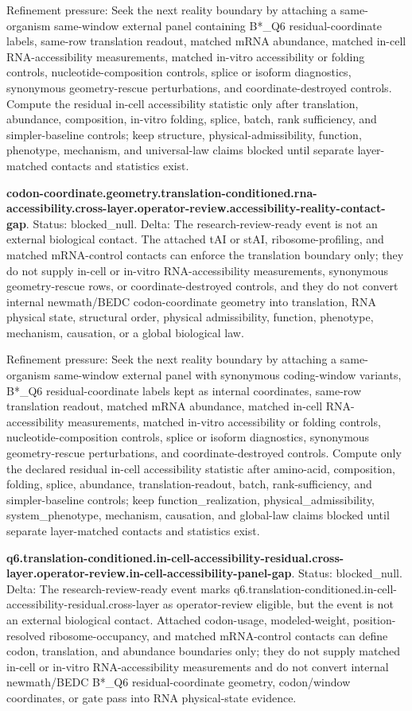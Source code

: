 Refinement pressure: Seek the next reality boundary by attaching a same-organism same-window external panel containing B*\_Q6 residual-coordinate labels, same-row translation readout, matched mRNA abundance, matched in-cell RNA-accessibility measurements, matched in-vitro accessibility or folding controls, nucleotide-composition controls, splice or isoform diagnostics, synonymous geometry-rescue perturbations, and coordinate-destroyed controls. Compute the residual in-cell accessibility statistic only after translation, abundance, composition, in-vitro folding, splice, batch, rank sufficiency, and simpler-baseline controls; keep structure, physical-admissibility, function, phenotype, mechanism, and universal-law claims blocked until separate layer-matched contacts and statistics exist.

\textbf{codon-coordinate.geometry.translation-conditioned.rna-accessibility.cross-layer.operator-review.accessibility-reality-contact-gap}. Status: blocked\_null. Delta: The research-review-ready event is not an external biological contact. The attached tAI or stAI, ribosome-profiling, and matched mRNA-control contacts can enforce the translation boundary only; they do not supply in-cell or in-vitro RNA-accessibility measurements, synonymous geometry-rescue rows, or coordinate-destroyed controls, and they do not convert internal newmath/BEDC codon-coordinate geometry into translation, RNA physical state, structural order, physical admissibility, function, phenotype, mechanism, causation, or a global biological law.

Refinement pressure: Seek the next reality boundary by attaching a same-organism same-window external panel with synonymous coding-window variants, B*\_Q6 residual-coordinate labels kept as internal coordinates, same-row translation readout, matched mRNA abundance, matched in-cell RNA-accessibility measurements, matched in-vitro accessibility or folding controls, nucleotide-composition controls, splice or isoform diagnostics, synonymous geometry-rescue perturbations, and coordinate-destroyed controls. Compute only the declared residual in-cell accessibility statistic after amino-acid, composition, folding, splice, abundance, translation-readout, batch, rank-sufficiency, and simpler-baseline controls; keep function\_realization, physical\_admissibility, system\_phenotype, mechanism, causation, and global-law claims blocked until separate layer-matched contacts and statistics exist.

\textbf{q6.translation-conditioned.in-cell-accessibility-residual.cross-layer.operator-review.in-cell-accessibility-panel-gap}. Status: blocked\_null. Delta: The research-review-ready event marks q6.translation-conditioned.in-cell-accessibility-residual.cross-layer as operator-review eligible, but the event is not an external biological contact. Attached codon-usage, modeled-weight, position-resolved ribosome-occupancy, and matched mRNA-control contacts can define codon, translation, and abundance boundaries only; they do not supply matched in-cell or in-vitro RNA-accessibility measurements and do not convert internal newmath/BEDC B*\_Q6 residual-coordinate geometry, codon/window coordinates, or gate pass into RNA physical-state evidence.

